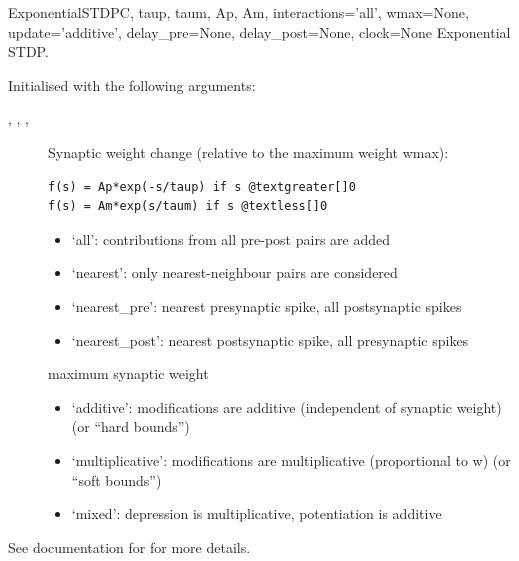 \documentclass[letterpaper,10pt,english]{manual}
\begin{document}
\hypertarget{brian.ExponentialSTDP}{}\begin{classdesc}{ExponentialSTDP}{C, taup, taum, Ap, Am, interactions='all', wmax=None, update='additive', delay\_pre=None, delay\_post=None, clock=None}
Exponential STDP.

Initialised with the following arguments:
\begin{description}
\item[, , , ] \leavevmode
Synaptic weight change (relative to the maximum weight wmax):

\begin{Verbatim}[commandchars=@\[\]]
f(s) = Ap*exp(-s/taup) if s @textgreater[]0
f(s) = Am*exp(s/taum) if s @textless[]0
\end{Verbatim}

\item[] \leavevmode\begin{itemize}
\item {} 
`all': contributions from all pre-post pairs are added

\item {} 
`nearest': only nearest-neighbour pairs are considered

\item {} 
`nearest\_pre': nearest presynaptic spike, all postsynaptic spikes

\item {} 
`nearest\_post': nearest postsynaptic spike, all presynaptic spikes

\end{itemize}

\item[] \leavevmode
maximum synaptic weight

\item[] \leavevmode\begin{itemize}
\item {} 
`additive': modifications are additive (independent of synaptic weight)
(or ``hard bounds'')

\item {} 
`multiplicative': modifications are multiplicative (proportional to w)
(or ``soft bounds'')

\item {} 
`mixed': depression is multiplicative, potentiation is additive

\end{itemize}

\end{description}

See documentation for \hyperlink{brian.STDP}{} for more details.
\end{classdesc}
\end{document}
